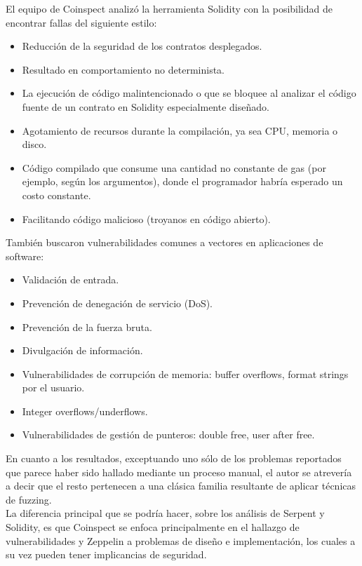 El equipo de Coinspect analizó la herramienta Solidity con la posibilidad de encontrar fallas del siguiente estilo:
\begin{itemize}
    \item Reducción de la seguridad de los contratos desplegados.
    \item Resultado en comportamiento no determinista.
    \item La ejecución de código malintencionado o que se bloquee al analizar el código fuente de un contrato en Solidity especialmente diseñado.
    \item Agotamiento de recursos durante la compilación, ya sea CPU, memoria o disco.
    \item Código compilado que consume una cantidad no constante de gas (por ejemplo, según los argumentos), donde el programador habría esperado un costo constante.
    \item Facilitando código malicioso (troyanos en código abierto).\newline
\end{itemize}

También buscaron vulnerabilidades comunes a vectores en aplicaciones de software:
\begin{itemize}
    \item Validación de entrada.
    \item Prevención de denegación de servicio (DoS).
    \item Prevención de la fuerza bruta.
    \item Divulgación de información.
    \item Vulnerabilidades de corrupción de memoria: buffer overflows, format strings por el usuario.
    \item Integer overflows/underflows.
    \item Vulnerabilidades de gestión de punteros: double free, user after free.
\end{itemize}


En cuanto a los resultados, exceptuando uno sólo de los problemas reportados que parece haber sido hallado mediante un proceso manual, el autor se atrevería a decir que el resto pertenecen a una clásica familia resultante de aplicar técnicas de fuzzing.\\

La diferencia principal que se podría hacer, sobre los análisis de Serpent y Solidity, es que Coinspect se enfoca principalmente en el hallazgo de vulnerabilidades y Zeppelin a problemas de diseño e implementación, los cuales a su vez pueden tener implicancias de seguridad.\\

